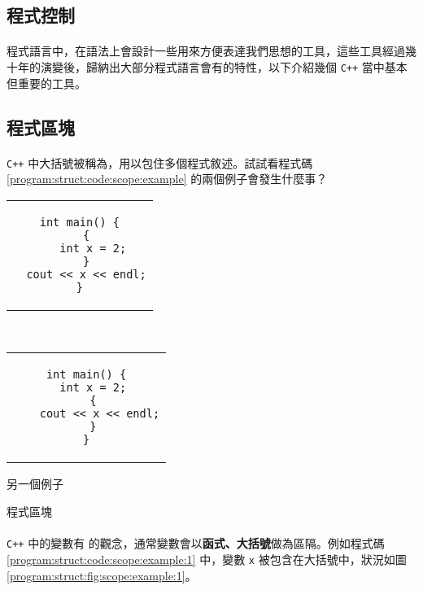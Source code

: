 \documentclass[12pt,a4paper,oneside]{report}
\begin{document}
\begin{CJK}{UTF8}{bkai}
\section{程式控制}

\paragraph{}程式語言中，在語法上會設計一些用來方便表達我們思想的工具，這些工具經過幾十年的演變後，歸納出大部分程式語言會有的特性，以下介紹幾個 \lstinline!C++! 當中基本但重要的工具。

\subsection{程式區塊}

\paragraph{}\lstinline!C++! 中大括號被稱為，用以包住多個程式敘述。試試看程式碼 \ref{program:struct:code:scope:example} 的兩個例子會發生什麼事？

\begin{code}[h!]
\centering
\begin{subcode}{.43\textwidth}
  \centering
  \begin{tabular}{c}
  \begin{lstlisting}
int main() {
  {
    int x = 2;
  }
  cout << x << endl;
}
  \end{lstlisting}
  \end{tabular}
  \caption{被大括號包住的 \lstinline!x!}
  \label{program:struct:code:scope:example:1}
\end{subcode}
~
\begin{subcode}{.43\textwidth}
  \centering
  \begin{tabular}{c}
  \begin{lstlisting}
int main() {
  int x = 2;
  {
    cout << x << endl;
  }
}
  \end{lstlisting}
  \end{tabular}
  \caption{另一個例子}
  \label{program:struct:code:scope:example:2}
\end{subcode}
\caption{程式區塊}
\label{program:struct:code:scope:example}
\end{code}

\paragraph{}\texttt{C++} 中的變數有 的觀念，通常變數會以{\color{blue}\textbf{函式、大括號}}做為區隔。例如程式碼 \ref{program:struct:code:scope:example:1} 中，變數 \lstinline!x! 被包含在大括號中，狀況如圖 \ref{program:struct:fig:scope:example:1}。


\end{CJK}
\end{document}
